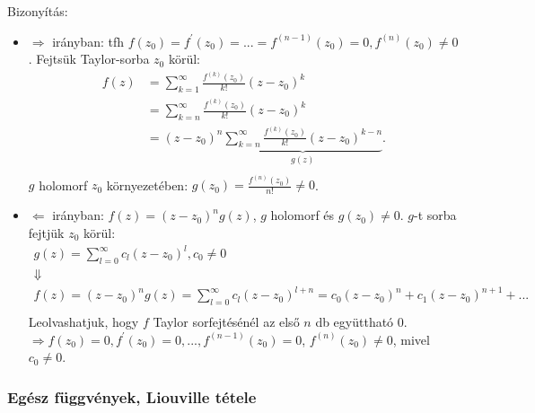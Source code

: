 \documentclass[12pt,a4paper]{scrartcl}
\providecommand{\tightlist}{%
  \setlength{\itemsep}{0pt}\setlength{\parskip}{0pt}}
\newenvironment{bizonyitas}{}{}
\begin{document}
\begin{bizonyitas}

Bizonyítás:

\begin{itemize}
\tightlist
\item
  \(\Rightarrow\) irányban: tfh
  \(f\left( z_{0} \right) = f^{\prime}\left( z_{0} \right) = ... = f^{({n - 1})}\left( z_{0} \right) = 0,f^{(n)}\left( z_{0} \right) \neq 0\).
  Fejtsük Taylor-sorba \(z_{0}\) körül: \[\begin{aligned}
    f\left( z \right) &  = \mathop \sum \limits_{k = 1}^\infty  \frac{{{f^{\left( k \right)}}\left( {{z_0}} \right)}}{{k!}}{\left( {z - {z_0}} \right)^k} \\ 
     &  = \mathop \sum \limits_{k = n}^\infty  \frac{{{f^{\left( k \right)}}\left( {{z_0}} \right)}}{{k!}}{\left( {z - {z_0}} \right)^k} \\ 
     &  = {\left( {z - {z_0}} \right)^n}\underbrace {\mathop \sum \limits_{k = n}^\infty  \frac{{{f^{\left( k \right)}}\left( {{z_0}} \right)}}{{k!}}{{\left( {z - {z_0}} \right)}^{k - n}}}_{g\left( z \right)}. \\ 
  \end{aligned} \]\(g\) holomorf \(z_{0}\) környezetében:
  \(g\left( z_{0} \right) = \frac{f^{(n)}\left( z_{0} \right)}{n!} \neq 0\).
\item
  \(\Leftarrow\) irányban:
  \(f\left( z \right) = \left( {z - z_{0}} \right)^{n}g\left( z \right)\),
  \(g\) holomorf és \(g\left( z_{0} \right) \neq 0\). \(g\)-t sorba
  fejtjük \(z_{0}\) körül: \[\begin{gathered}
    g(z) = \sum\limits_{l = 0}^\infty  {{c_l}{{(z - {z_0})}^l}} ,{c_0} \ne 0 \\ 
     \Downarrow  \\ 
    f(z) = {(z - {z_0})^n}g(z) = \sum\limits_{l = 0}^\infty  {{c_l}{{(z - {z_0})}^{l + n}}}  = {c_0}{(z - {z_0})^n} + {c_1}{(z - {z_0})^{n + 1}} + ... \\ 
  \end{gathered} \] Leolvashatjuk, hogy \(f\) Taylor sorfejtésénél az
  első \(n\) db együttható 0.
  \(\left. \Rightarrow f\left( z_{0} \right) = 0,f^{\prime}\left( z_{0} \right) = 0,...,f^{({n - 1})}\left( z_{0} \right) = 0 \right.\),
  \(f^{(n)}\left( z_{0} \right) \neq 0\), mivel \(c_{0} \neq 0\).
\end{itemize}

\end{bizonyitas}

\hypertarget{egesz-fuggvenyek-liouville-tetele}{%
\subsubsection{Egész függvények, Liouville
tétele}\label{egesz-fuggvenyek-liouville-tetele}}
\end{document}
